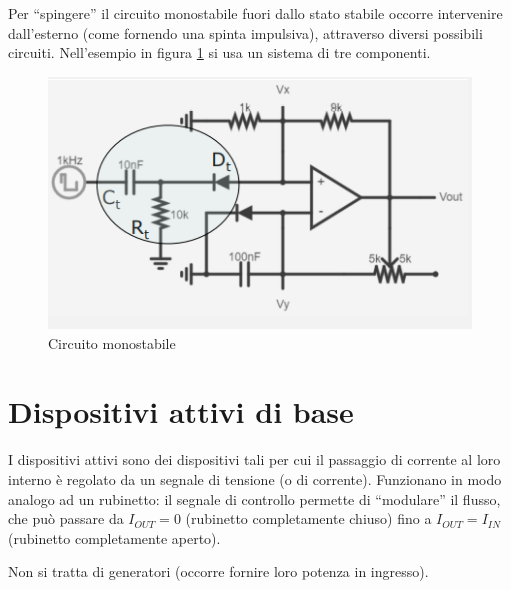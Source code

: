 \documentclass{article}
\begin{document}
\vspace{3mm}

Per ``spingere” il circuito monostabile fuori dallo stato stabile occorre intervenire dall’esterno (come fornendo una spinta impulsiva), attraverso diversi possibili circuiti. Nell'esempio in figura \ref{Schema_circuito_monostabile_bis} si usa un sistema di tre componenti.

\begin{figure}[h]
  \centering
  \includegraphics[scale=0.7]{IM_circuito_monostabile_bis}
  \caption{Circuito monostabile}
  \label{Schema_circuito_monostabile_bis}
\end{figure}

\clearpage
















\section{Dispositivi attivi di base}

I dispositivi attivi sono dei dispositivi tali per cui il passaggio di corrente al loro interno è regolato da un segnale di tensione (o di corrente). Funzionano in modo analogo ad un rubinetto: il segnale di controllo permette di ``modulare'' il flusso, che può passare da $I_{OUT} = 0$ (rubinetto completamente chiuso) fino a $I_{OUT} = I_{IN}$ (rubinetto completamente aperto).

Non si tratta di generatori (occorre fornire loro potenza in ingresso).
\end{document}
